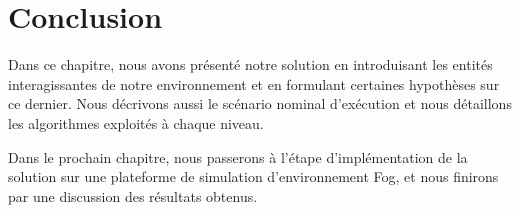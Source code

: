 \section{Conclusion}
Dans ce chapitre, nous avons présenté notre solution en introduisant les entités interagissantes de notre environnement et en formulant certaines hypothèses sur ce dernier. Nous décrivons aussi le scénario nominal d'exécution et nous détaillons les algorithmes exploités à chaque niveau.\par
Dans le prochain chapitre, nous passerons à l'étape d'implémentation de la solution sur une plateforme de simulation d'environnement Fog, et nous finirons par une discussion des résultats obtenus.
